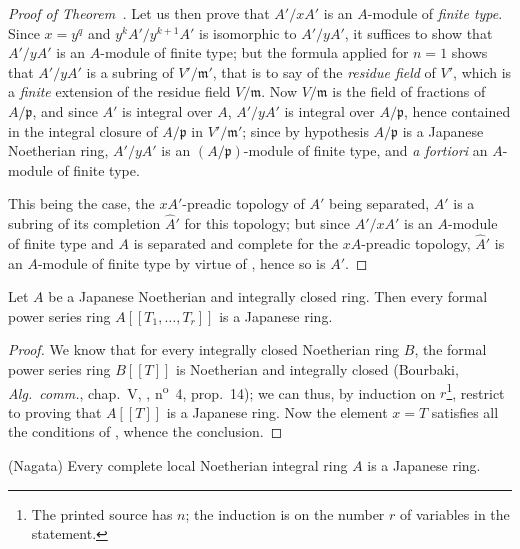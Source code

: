 \begin{proof}[Proof of Theorem~{\rm{}}]
Let us then prove that $A'/xA'$ is an $A$-module of \emph{finite type}.
Since $x=y^q$ and $y^kA'/y^{k+1}A'$ is isomorphic to $A'/yA'$, it suffices to show that $A'/yA'$ is an $A$-module of finite type; but the formula  applied for $n=1$ shows that $A'/yA'$ is a subring of $V'/\mathfrak{m}'$, that is to say of the \emph{residue field} of $V'$, which is a \emph{finite} extension of the residue field $V/\mathfrak{m}$.
Now $V/\mathfrak{m}$ is the field of fractions of $A/\mathfrak{p}$, and since $A'$ is integral over $A$, $A'/yA'$ is integral over $A/\mathfrak{p}$, hence contained in the integral closure of $A/\mathfrak{p}$ in $V'/\mathfrak{m}'$; since by hypothesis $A/\mathfrak{p}$ is a Japanese Noetherian ring, $A'/yA'$ is an $(A/\mathfrak{p})$-module of finite type, and \emph{a fortiori} an $A$-module of finite type.

This being the case, the $xA'$-preadic topology of $A'$ being separated, $A'$ is a subring of its completion $\hat{A}'$ for this topology; but since $A'/xA'$ is an $A$-module of finite type and $A$ is separated and complete for the $xA$-preadic topology, $\hat{A}'$ is an $A$-module of finite type by virtue of , hence so is $A'$.
\end{proof}

\begin{corollary}[23.1.4]
\label{0.23.1.4}
Let $A$ be a Japanese Noetherian and integrally closed ring.
Then every formal power series ring $A[[T_1,\ldots,T_r]]$ is a Japanese ring.
\end{corollary}

\begin{proof}
We know that for every integrally closed Noetherian ring $B$, the formal power series ring $B[[T]]$ is Noetherian and integrally closed (Bourbaki, \emph{Alg.~comm.}, chap.~V, , n\textsuperscript{o}~4, prop.~14); we can thus, by induction on $r$\footnote{The printed source has $n$; the induction is on the number $r$ of variables in the statement.}, restrict to proving that $A[[T]]$ is a Japanese ring.
Now the element $x=T$ satisfies all the conditions of , whence the conclusion.
\end{proof}

\begin{theorem}[23.1.5]
\label{0.23.1.5}
\textnormal{(Nagata)}
Every complete local Noetherian integral ring $A$ is a Japanese ring.
\end{theorem}

